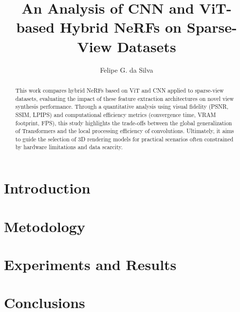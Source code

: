 \documentclass[12pt]{article}
\title{An Analysis of CNN and ViT-based Hybrid NeRFs on Sparse-View Datasets}
\author{Felipe G. da Silva\inst{1}}
\begin{document}
 

\maketitle

\begin{abstract}
   This work compares hybrid NeRFs based on ViT and CNN applied to sparse-view datasets, evaluating the impact of these feature extraction architectures on novel view synthesis performance. Through a quantitative analysis using visual fidelity (PSNR, SSIM, LPIPS) and computational efficiency metrics (convergence time, VRAM footprint, FPS), this study highlights the trade-offs between the global generalization of Transformers and the local processing efficiency of convolutions. Ultimately, it aims to guide the selection of 3D rendering models for practical scenarios often constrained by hardware limitations and data scarcity.
\end{abstract}

\section{Introduction}

\section{Metodology} 
\label{sec:metodology}

\section{Experiments and Results}


\section{Conclusions}





\end{document}

